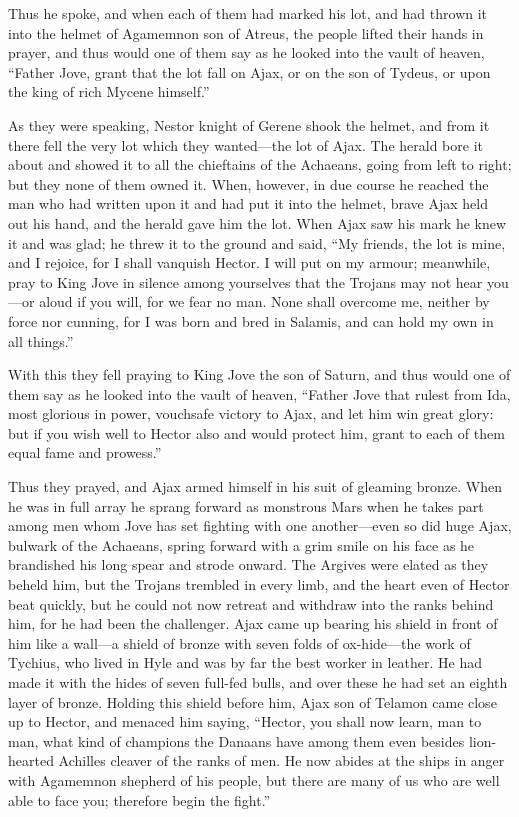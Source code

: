 Thus he spoke, and when each of them had marked his lot, and had thrown it
into the helmet of Agamemnon son of Atreus, the people lifted their hands
in prayer, and thus would one of them say as he looked into the vault of
heaven, “Father Jove, grant that the lot fall on Ajax, or on the son of
Tydeus, or upon the king of rich Mycene himself.”

As they were speaking, Nestor knight of Gerene shook the helmet, and from
it there fell the very lot which they wanted—the lot of Ajax. The
herald bore it about and showed it to all the chieftains of the Achaeans,
going from left to right; but they none of them owned it. When, however,
in due course he reached the man who had written upon it and had put it
into the helmet, brave Ajax held out his hand, and the herald gave him the
lot. When Ajax saw his mark he knew it and was glad; he threw it to the
ground and said, “My friends, the lot is mine, and I rejoice, for I shall
vanquish Hector. I will put on my armour; meanwhile, pray to King Jove in
silence among yourselves that the Trojans may not hear you—or aloud
if you will, for we fear no man. None shall overcome me, neither by force
nor cunning, for I was born and bred in Salamis, and can hold my own in
all things.”

With this they fell praying to King Jove the son of Saturn, and thus would
one of them say as he looked into the vault of heaven, “Father Jove that
rulest from Ida, most glorious in power, vouchsafe victory to Ajax, and
let him win great glory: but if you wish well to Hector also and would
protect him, grant to each of them equal fame and prowess.”

Thus they prayed, and Ajax armed himself in his suit of gleaming bronze.
When he was in full array he sprang forward as monstrous Mars when he
takes part among men whom Jove has set fighting with one another—even
so did huge Ajax, bulwark of the Achaeans, spring forward with a grim
smile on his face as he brandished his long spear and strode onward. The
Argives were elated as they beheld him, but the Trojans trembled in every
limb, and the heart even of Hector beat quickly, but he could not now
retreat and withdraw into the ranks behind him, for he had been the
challenger. Ajax came up bearing his shield in front of him like a wall—a
shield of bronze with seven folds of ox-hide—the work of Tychius, who
lived in Hyle and was by far the best worker in leather. He had made it
with the hides of seven full-fed bulls, and over these he had set an
eighth layer of bronze. Holding this shield before him, Ajax son of
Telamon came close up to Hector, and menaced him saying, “Hector, you
shall now learn, man to man, what kind of champions the Danaans have among
them even besides lion-hearted Achilles cleaver of the ranks of men. He
now abides at the ships in anger with Agamemnon shepherd of his people,
but there are many of us who are well able to face you; therefore begin
the fight.”

